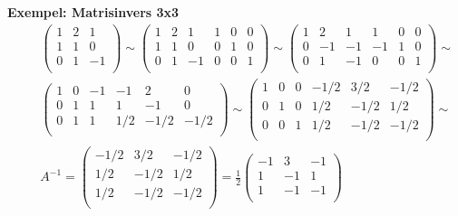 \textbf{Exempel: Matrisinvers 3x3}
\begin{align*}
  &\quad
  \left(\begin{array}{ccc}
    1 & 2 & 1 \\
    1 & 1 & 0 \\
    0 & 1 & -1 \\
  \end{array}\right) \sim{}
  \left(\begin{array}{ccc|ccc}
    1 & 2 & 1   & 1 & 0 & 0 \\
    1 & 1 & 0   & 0 & 1 & 0 \\
    0 & 1 & -1  & 0 & 0 & 1 \\
  \end{array}\right) \sim{}
  \left(\begin{array}{ccc|ccc}
    1 & 2  & 1  & 1  & 0 & 0 \\
    0 & -1 & -1 & -1 & 1 & 0 \\
    0 & 1  & -1 & 0  & 0 & 1 \\
  \end{array}\right) \sim{} \\
  &\quad
  \left(\begin{array}{ccc|ccc}
    1 & 0  & -1 & -1  & 2    & 0   \\
    0 & 1  & 1  & 1   & -1   & 0   \\
    0 & 1  & 1  & 1/2 & -1/2 & -1/2 \\
  \end{array}\right) \sim{}
  \left(\begin{array}{ccc|ccc}
    1 & 0  & 0  & -1/2  & 3/2  & -1/2   \\
    0 & 1  & 0  & 1/2   & -1/2 & 1/2 \\
    0 & 0  & 1  & 1/2   & -1/2 & -1/2 \\
  \end{array}\right) \sim{} \\
  &\quad
  A^{-1}=
  \left(\begin{array}{ccc}
    -1/2  & 3/2  & -1/2   \\
    1/2   & -1/2 & 1/2 \\
    1/2   & -1/2 & -1/2 \\
  \end{array}\right) = \frac{1}{2}
  \left(\begin{array}{ccc}
    -1  & 3  & -1  \\
    1   & -1 & 1   \\
    1   & -1 & -1  \\
  \end{array}\right)
\end{align*}

